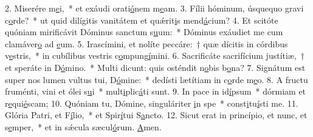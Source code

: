 2. Miserére m\uline{e}i,~* et exáudi orati\uline{ó}nem m\uline{e}am.
3. Fílii hóminum, úsquequo gravi c\uline{o}rde?~* ut quid dilígitis vanitátem et quǽrit\uline{i}s mend\uline{á}cium?
4. Et scitóte quóniam mirificávit Dóminus sanctum s\uline{u}um:~* Dóminus exáudiet me cum clamáver\uline{o} ad \uline{e}um.
5. Irascímini, et nolíte peccáre:~† quæ dícitis in córdibus v\uline{e}stris,~* in cubílibus vestris c\uline{o}mpung\uline{í}mini.
6. Sacrificáte sacrifícium justítiæ,~† et speráte in D\uline{ó}mino.~* Multi dicunt: quis osténdit n\uline{o}bis b\uline{o}na?
7. Signátum est super nos lumen vultus tui, D\uline{ó}mine:~* dedísti lætítiam in c\uline{o}rde m\uline{e}o.
8. A fructu fruménti, vini et ólei s\uline{u}i~* mult\uline{i}plic\uline{á}ti sunt.
9. In pace in id\uline{í}psum~* dórmiam et r\uline{e}qui\uline{é}scam;
10. Quóniam tu, Dómine, singuláriter \uline{i}n spe~* const\uline{i}tu\uline{í}sti me.
11. Glória Patri, et F\uline{í}lio,~* et Spir\uline{í}tui S\uline{a}ncto.
12. Sicut erat in princípio, et nunc, et s\uline{e}mper,~* et in sǽcula sæcul\uline{ó}rum. \uline{A}men.
